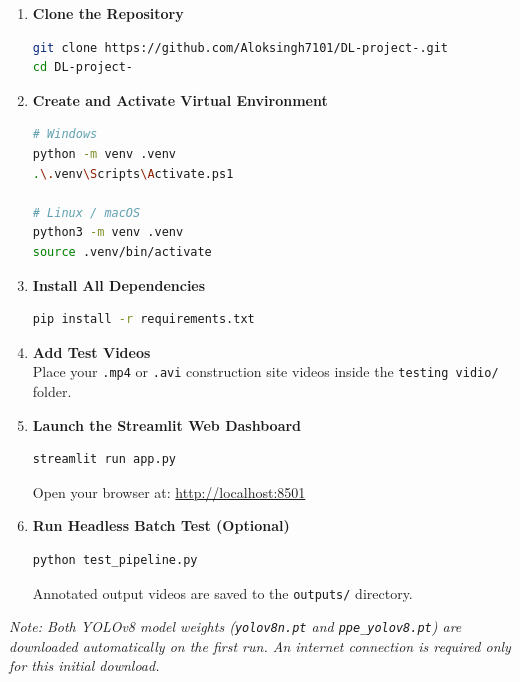 \documentclass[12pt,a4paper]{report}
\begin{document}
\begin{enumerate}
    \item \textbf{Clone the Repository}
    \begin{lstlisting}[language=bash]
git clone https://github.com/Aloksingh7101/DL-project-.git
cd DL-project-
    \end{lstlisting}

    \item \textbf{Create and Activate Virtual Environment}
    \begin{lstlisting}[language=bash]
# Windows
python -m venv .venv
.\.venv\Scripts\Activate.ps1

# Linux / macOS
python3 -m venv .venv
source .venv/bin/activate
    \end{lstlisting}

    \item \textbf{Install All Dependencies}
    \begin{lstlisting}[language=bash]
pip install -r requirements.txt
    \end{lstlisting}

    \item \textbf{Add Test Videos} \\
    Place your \texttt{.mp4} or \texttt{.avi} construction site videos inside the \texttt{testing vidio/} folder.

    \item \textbf{Launch the Streamlit Web Dashboard}
    \begin{lstlisting}[language=bash]
streamlit run app.py
    \end{lstlisting}
    Open your browser at: \url{http://localhost:8501}

    \item \textbf{Run Headless Batch Test (Optional)}
    \begin{lstlisting}[language=bash]
python test_pipeline.py
    \end{lstlisting}
    Annotated output videos are saved to the \texttt{outputs/} directory.
\end{enumerate}

\noindent\textit{Note: Both YOLOv8 model weights (\texttt{yolov8n.pt} and \texttt{ppe\_yolov8.pt}) are downloaded automatically on the first run. An internet connection is required only for this initial download.}

\end{document}
